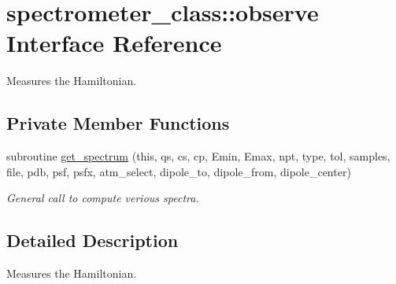 \hypertarget{interfacespectrometer__class_1_1observe}{\section{spectrometer\-\_\-class\-:\-:observe Interface Reference}
\label{interfacespectrometer__class_1_1observe}
}


Measures the Hamiltonian.  


\subsection*{Private Member Functions}
\begin{DoxyCompactItemize}
\item 
subroutine \hyperlink{interfacespectrometer__class_1_1observe_ab17bdd571e63c8de9fb5029c8af31967}{get\-\_\-spectrum} (this, qs, cs, cp, Emin, Emax, npt, type, tol, samples, file, pdb, psf, psfx, atm\-\_\-select, dipole\-\_\-to, dipole\-\_\-from, dipole\-\_\-center)
\begin{DoxyCompactList}\small\item\em General call to compute verious spectra. \end{DoxyCompactList}\end{DoxyCompactItemize}


\subsection{Detailed Description}
Measures the Hamiltonian. 


